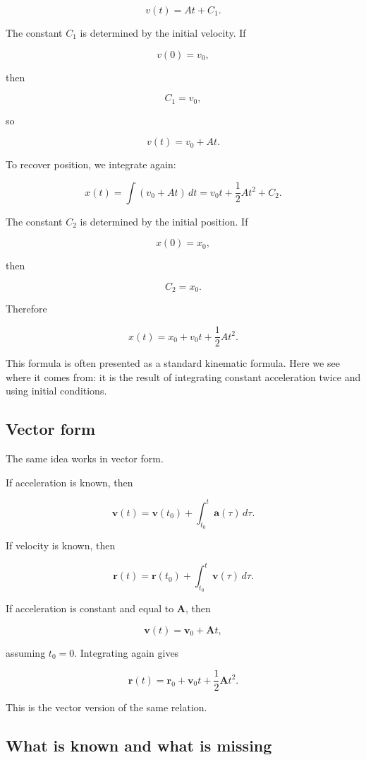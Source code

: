 \[
v(t)=At+C_1.
\]

The constant \(C_1\) is determined by the initial velocity. If

\[
v(0)=v_0,
\]

then

\[
C_1=v_0,
\]

so

\[
v(t)=v_0+At.
\]

To recover position, we integrate again:

\[
x(t)=\int (v_0+At)\,dt
=
v_0t+\frac{1}{2}At^2+C_2.
\]

The constant \(C_2\) is determined by the initial position. If

\[
x(0)=x_0,
\]

then

\[
C_2=x_0.
\]

Therefore

\[
x(t)=x_0+v_0t+\frac{1}{2}At^2.
\]

This formula is often presented as a standard kinematic formula. Here we see where it comes from: it is the result of integrating constant acceleration twice and using initial conditions.

\subsection{Vector form}

The same idea works in vector form.

If acceleration is known, then

\[
\mathbf{v}(t)
=
\mathbf{v}(t_0)+\int_{t_0}^{t}\mathbf{a}(\tau)\,d\tau.
\]

If velocity is known, then

\[
\mathbf{r}(t)
=
\mathbf{r}(t_0)+\int_{t_0}^{t}\mathbf{v}(\tau)\,d\tau.
\]

If acceleration is constant and equal to \(\mathbf{A}\), then

\[
\mathbf{v}(t)=\mathbf{v}_0+\mathbf{A}t,
\]

assuming \(t_0=0\). Integrating again gives

\[
\mathbf{r}(t)=\mathbf{r}_0+\mathbf{v}_0t+\frac{1}{2}\mathbf{A}t^2.
\]

This is the vector version of the same relation.

\subsection{What is known and what is missing}

